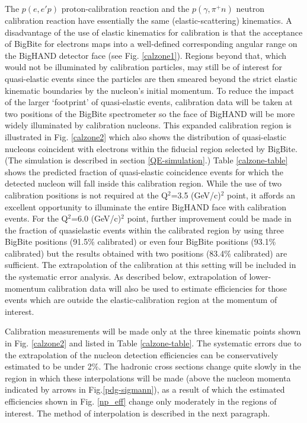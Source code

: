 \documentclass[12pt,letterpaper,oneside]{article}
\begin{document}
The $p(e,e'p)$ proton-calibration reaction and the $p(\gamma,\pi^+n)$
neutron calibration reaction have essentially the same
(elastic-scattering) kinematics.
A disadvantage of the use of elastic kinematics for calibration is
that the acceptance of BigBite for electrons maps into a well-defined
corresponding angular range on the BigHAND detector face 
(see Fig. \ref{calzone1}).  Regions
beyond that, which would not be illuminated by calibration particles, may
still be of interest for quasi-elastic events since the particles are
then smeared beyond the strict elastic kinematic boundaries by the nucleon's
initial momentum.  To reduce the impact of the larger `footprint' of
quasi-elastic events, calibration data will
be taken at two positions of the BigBite spectrometer so the face of
BigHAND will be more widely illuminated by calibration nucleons.
This expanded calibration region is illustrated in Fig. \ref{calzone2}
which also shows the distribution of quasi-elastic nucleons coincident
with electrons within the fiducial region selected by  BigBite.
(The simulation is described in section \ref{QE-simulation}.) Table
\ref{calzone-table} shows the predicted fraction of quasi-elastic coincidence
events for which the detected nucleon will fall inside this
 calibration region. While the use of two calibration positions is not
 required at the Q$^2$=3.5 (GeV/c)$^2$ point, it affords an
 excellent opportunity to illuminate the entire BigHAND face with
 calibration events.  For the Q$^2$=6.0 (GeV/c)$^2$ point, further 
improvement could be made in the fraction of quasielastic events within
the calibrated region by using three BigBite positions (91.5\%
calibrated) or even four BigBite positions (93.1\% calibrated) but 
the results obtained with two positions (83.4\% calibrated) are
sufficient.  The extrapolation of the calibration at this setting will
be included in the systematic error analysis.
 As described below, extrapolation of lower-momentum 
calibration data will also be used to estimate efficiencies for those
events which are outside the elastic-calibration region at the
momentum of interest.

Calibration measurements will be made only at the three kinematic points
shown in Fig. \ref{calzone2} and listed in Table \ref{calzone-table}.
The systematic errors due to the extrapolation of the
nucleon detection efficiencies can be conservatively estimated to
be under 2\%.
 The hadronic cross sections change quite slowly in the
region in which these interpolations will be made (above the nucleon
momenta indicated by arrows in  Fig.\ref{pdg-sigmann}), as a result of which the estimated
efficiencies shown in Fig. \ref{np_eff} change only moderately in the
regions of interest.  The method of interpolation is described in the next paragraph.
\end{document}
